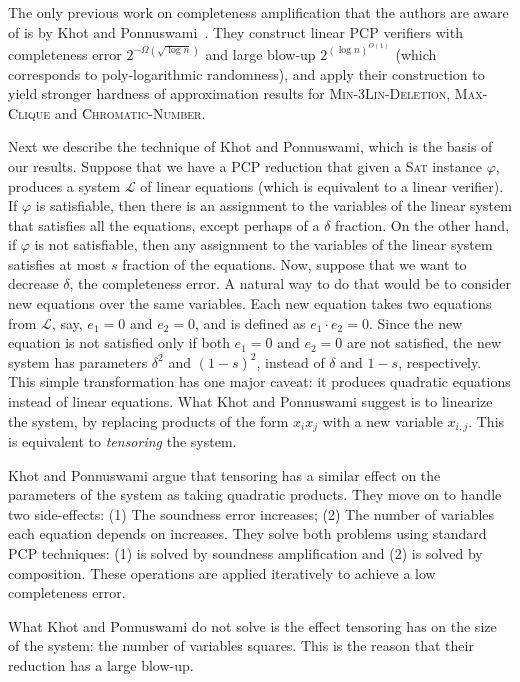 The only previous work on completeness amplification that the authors
are aware of is by Khot and Ponnuswami~\cite{KP}. They construct linear PCP
verifiers with completeness error $2^{-\Omega(\sqrt{\log n})}$ and large blow-up $2^{(\log n)^{O(1)}}$ (which corresponds to poly-logarithmic randomness), and
apply their construction to yield stronger hardness of approximation
results for \textsc{Min-3Lin-Deletion}, \textsc{Max-Clique} and \textsc{Chromatic-Number}. 

Next we describe the technique of Khot and Ponnuswami, which is the basis of our results.
Suppose that we have a PCP reduction that given a \textsc{Sat} instance $\varphi$, produces a system $\mathcal{L}$ of linear equations (which is equivalent to a linear verifier). If $\varphi$ is satisfiable, then there is an assignment to the variables of the linear system that satisfies all the equations, except perhaps of a $\delta$ fraction. On the other hand, if $\varphi$ is not satisfiable, then any assignment to the variables of the linear system satisfies at most $s$ fraction of the equations. Now, suppose that we want to decrease $\delta$, the completeness error. 
A natural way to do that would be to consider new equations over the same variables. Each new equation takes two equations from $\mathcal{L}$, say, $e_1 = 0$ and $e_2 =0$, and is defined as $e_1\cdot e_2 = 0$. Since the new equation is not satisfied only if both $e_1=0$ and $e_2 = 0$ are not satisfied,
the new system has parameters $\delta^2$ and $(1-s)^2$, instead of $\delta$ and $1-s$, respectively. This simple transformation has one major caveat: it produces quadratic equations instead of linear equations. What Khot and Ponnuswami suggest is to linearize the system, by replacing products of the form $x_i x_j$ with a new variable $x_{i,j}$. This is equivalent to {\em tensoring} the system.

Khot and Ponnuswami argue that tensoring has a similar effect on the parameters of the system as taking quadratic products. They move on to handle two side-effects: (1) The soundness error increases; (2) The number of variables each equation depends on increases. They solve both problems using standard PCP techniques: (1) is solved by soundness amplification and (2) is solved by composition. These operations are applied iteratively to achieve a low completeness error.

What Khot and Ponnuswami do not solve is the effect tensoring has on the size of the system: the number of variables squares. This is the reason that their reduction has a large blow-up. 

